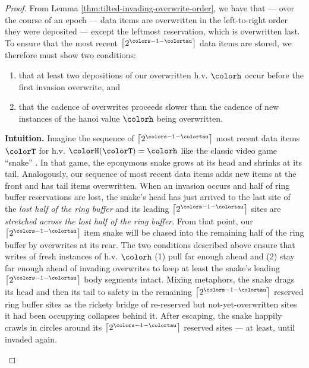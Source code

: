 \begin{proof}
From Lemma \ref{thm:tilted-invading-overwrite-order}, we have that --- over the course of an epoch --- data items are overwritten in the left-to-right order they were deposited --- except the leftmost reservation, which is overwritten last.
To ensure that the most recent $\left\lceil 2^{\colors - 1 - \colortau} \right\rceil$ data items are stored, we therefore must show two conditions:
\begin{enumerate}
\item that at least two depositions of our overwritten h.v. $\colorh$ occur before the first invasion overwrite, and
\item that the cadence of overwrites proceeds slower than the cadence of new instances of the hanoi value $\colorh$ being overwritten.
\end{enumerate}

\begin{mybox}
\textbf{Intuition.}
Imagine the sequence of $\left\lceil 2^{\colors - 1 - \colortau} \right\rceil$ most recent data items $\colorT$ for h.v. $\colorH(\colorT) = \colorh$ like the classic video game ``snake'' \citep{de2016complexity}.
In that game, the eponymous snake grows at its head and shrinks at its tail.
Analogously, our sequence of most recent data items adds new items at the front and has tail items overwritten.
When an invasion occurs and half of ring buffer reservations are lost, the snake's head has just arrived to the last site of the \textit{lost half of the ring buffer} and its leading $\left\lceil 2^{\colors - 1 - \colortau} \right\rceil$ sites are \textit{stretched across the lost half of the ring buffer}.
From that point, our $\left\lceil 2^{\colors - 1 - \colortau} \right\rceil$ item snake will be chased into the remaining half of the ring buffer by overwrites at its rear.
The two conditions described above ensure that writes of fresh instances of h.v. $\colorh$ (1) pull far enough ahead and (2) stay far enough ahead of invading overwrites to keep at least the snake's leading $\left\lceil 2^{\colors - 1 - \colortau} \right\rceil$ body segments intact.
Mixing metaphors, the snake drags its head and then its tail to safety in the remaining $\left\lceil 2^{\colors - 1 - \colortau} \right\rceil$ reserved ring buffer sites as the rickety bridge of re-reserved but not-yet-overwritten sites it had been occupying collapses behind it.
After escaping, the snake happily crawls in circles around its $\left\lceil 2^{\colors - 1 - \colortau} \right\rceil$ reserved sites --- at least, until invaded again.
\end{mybox}


\end{proof}
